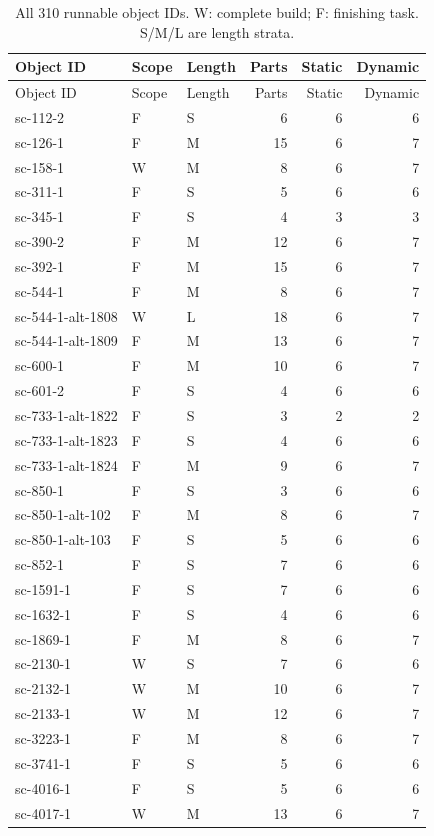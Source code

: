 \small\begin{longtable}{@{}p{}llrrr@{}}\caption{All 310 runnable object IDs. W: complete build; F: finishing task. S/M/L are length strata.}\\\toprule Object ID & Scope & Length & Parts & Static & Dynamic\\\midrule\endfirsthead\toprule Object ID & Scope & Length & Parts & Static & Dynamic\\\midrule\endhead
sc-112-2 & F & S & 6 & 6 & 6\\
sc-126-1 & F & M & 15 & 6 & 7\\
sc-158-1 & W & M & 8 & 6 & 7\\
sc-311-1 & F & S & 5 & 6 & 6\\
sc-345-1 & F & S & 4 & 3 & 3\\
sc-390-2 & F & M & 12 & 6 & 7\\
sc-392-1 & F & M & 15 & 6 & 7\\
sc-544-1 & F & M & 8 & 6 & 7\\
sc-544-1-alt-1808 & W & L & 18 & 6 & 7\\
sc-544-1-alt-1809 & F & M & 13 & 6 & 7\\
sc-600-1 & F & M & 10 & 6 & 7\\
sc-601-2 & F & S & 4 & 6 & 6\\
sc-733-1-alt-1822 & F & S & 3 & 2 & 2\\
sc-733-1-alt-1823 & F & S & 4 & 6 & 6\\
sc-733-1-alt-1824 & F & M & 9 & 6 & 7\\
sc-850-1 & F & S & 3 & 6 & 6\\
sc-850-1-alt-102 & F & M & 8 & 6 & 7\\
sc-850-1-alt-103 & F & S & 5 & 6 & 6\\
sc-852-1 & F & S & 7 & 6 & 6\\
sc-1591-1 & F & S & 7 & 6 & 6\\
sc-1632-1 & F & S & 4 & 6 & 6\\
sc-1869-1 & F & M & 8 & 6 & 7\\
sc-2130-1 & W & S & 7 & 6 & 6\\
sc-2132-1 & W & M & 10 & 6 & 7\\
sc-2133-1 & W & M & 12 & 6 & 7\\
sc-3223-1 & F & M & 8 & 6 & 7\\
sc-3741-1 & F & S & 5 & 6 & 6\\
sc-4016-1 & F & S & 5 & 6 & 6\\
sc-4017-1 & W & M & 13 & 6 & 7\\

\end{longtable}
